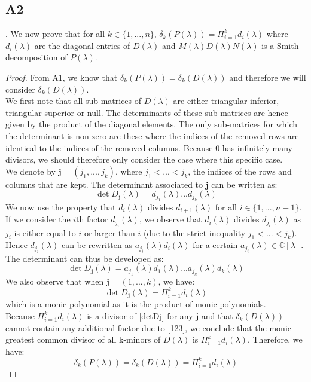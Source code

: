 \documentclass[11pt]{article}
\newcommand{\complex}{\mathbb{C}} %
\begin{document}
\subsection*{A2}.
We now prove that for all $k\in\{1,...,n\}$, $\delta_k(P(\lambda))=\Pi^k_{i=1}d_i(\lambda)$ where $d_i(\lambda)$ are the diagonal entries of $D(\lambda)$ and $M(\lambda)D(\lambda)N(\lambda)$ is a Smith decomposition of $P(\lambda)$.
\begin{proof}
From A1, we know that $\delta_k(P(\lambda))=\delta_k(D(\lambda))$ and therefore we will consider $\delta_k(D(\lambda))$.\\
We first note that all sub-matrices of $D(\lambda)$ are either triangular inferior, triangular superior or null. The determinants of these sub-matrices are hence given by the product of the diagonal elements. The only sub-matrices for which the determinant is non-zero are these where the indices of the removed rows are identical to the indices of the removed columns. Because 0 has infinitely many divisors, we should therefore only consider the case where this specific case.\\
We denote by $\textbf{j}=(j_1,...,j_k)$, where $j_1<...<j_k$, the indices of the rows and columns that are kept. The determinant associated to $\textbf{j}$ can be written as:
\begin{equation*}
    \det D_{\textbf{j}}(\lambda)=d_{j_1}(\lambda)...d_{j_k}(\lambda)
\end{equation*}
We now use the property that $d_i(\lambda)$ divides $d_{i+1}(\lambda)$ for all $i\in\{1,...,n-1\}$.\\
If we consider the $i$th factor $d_{j_i}(\lambda)$, we observe that $d_i(\lambda)$ divides $d_{j_i}(\lambda)$ as $j_i$ is either equal to $i$ or larger than $i$ (due to the strict inequality $j_1<...<j_k$). Hence $d_{j_i}(\lambda)$ can be rewritten as $a_{j_i}(\lambda)d_i(\lambda)$ for a certain $a_{j_i}(\lambda)\in\complex[\lambda]$. The determinant can thus be developed as:
\begin{equation}\label{detDj}
    \det D_{\textbf{j}}(\lambda)=a_{j_1}(\lambda) d_1(\lambda)...a_{j_k}(\lambda)d_{k}(\lambda)
\end{equation}
We also observe that when $\textbf{j}=(1,...,k)$, we have:
\begin{equation}\label{123}
    \det D_{\textbf{j}}(\lambda)=\Pi_{i=1}^k d_i(\lambda)
\end{equation}
which is a monic polynomial as it is the product of monic polynomials.\\
Because $\Pi_{i=1}^k d_i(\lambda)$ is a divisor of \eqref{detDj} for any $\textbf{j}$ and that $\delta_k(D(\lambda))$ cannot contain any additional factor due to \eqref{123}, we conclude that the monic greatest common divisor of all k-minors of $D(\lambda)$ is $\Pi_{i=1}^k d_i(\lambda)$. Therefore, we have:
\begin{equation}\label{A21}
    \delta_k(P(\lambda))=\delta_k(D(\lambda))=\Pi_{i=1}^k d_i(\lambda)
\end{equation}
\end{proof}
\end{document}
